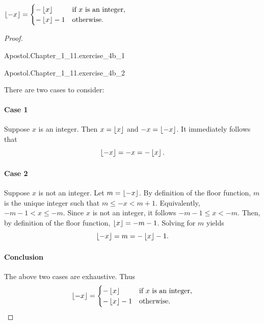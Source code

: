 \documentclass{report}
\begin{document}
\subsubsection{}%
\label{ssub:exercise-1.11.4b}

$\left\lfloor-x\right\rfloor =
  \begin{cases}
    -\left\lfloor x\right\rfloor & \text{if } x \text{ is an integer}, \\
    -\left\lfloor x\right\rfloor - 1 & \text{otherwise}.
  \end{cases}$

\begin{proof}

  \ \vspace{6pt}

    {Apostol.Chapter\_1\_11.exercise\_4b\_1}

    {Apostol.Chapter\_1\_11.exercise\_4b\_2}

  There are two cases to consider:

  \paragraph{Case 1}%

    Suppose $x$ is an integer.
    Then $x = \left\lfloor x\right\rfloor$ and $-x = \left\lfloor-x\right\rfloor$.
    It immediately follows that $$\left\lfloor-x\right\rfloor = -x = -\left\lfloor x\right\rfloor.$$

  \paragraph{Case 2}%

    Suppose $x$ is not an integer.
    Let $m = \left\lfloor-x\right\rfloor$.
    By definition of the floor function, $m$ is the unique integer such that
      $m \leq -x < m + 1$.
    Equivalently, $-m - 1 < x \leq -m$.
    Since $x$ is not an integer, it follows $-m - 1 \leq x < -m$.
    Then, by definition of the floor function, $\left\lfloor x\right\rfloor = -m - 1$.
    Solving for $m$ yields $$\left\lfloor-x\right\rfloor = m = -\left\lfloor x\right\rfloor - 1.$$

  \paragraph{Conclusion}%

    The above two cases are exhaustive. Thus
      $$\left\lfloor-x\right\rfloor =
        \begin{cases}
          -\left\lfloor x\right\rfloor & \text{if } x \text{ is an integer}, \\
          -\left\lfloor x\right\rfloor - 1 & \text{otherwise}.
        \end{cases}$$

\end{proof}
\end{document}
